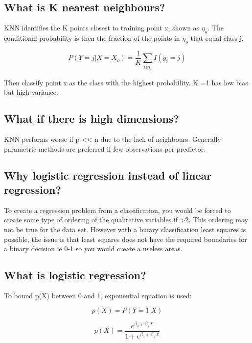 \documentclass[11pt]{scrartcl} %
\begin{document}
\subsection{What is K nearest neighbours?}

KNN identifies the K points closest to training point x, shown as \(\eta_o\). The conditional probability is then
the fraction of the points in \(\eta_o\) that equal class j.

\begin{equation}
	P(Y=j|X=X_o) = \frac{1}{K}\sum_{i\epsilon \eta_o}{I(y_i=j)}
\end{equation}

Then classify point x as the class with the highest probability. K =1 has low bias but high variance.

\subsection{What if there is high dimensions?}

KNN performs worse if p << n due to the lack of neighbours. Generally parametric methods are preferred if
few observations per predictor.

\subsection{Why logistic regression instead of linear regression?}

To create a regression problem from a classification, you would be forced to create some type of ordering of the qualitative
variables if >2. This ordering may not be true for the data set. However with a binary classification least squares is possible, the
issue is that least squares does not have the required boundaries for a binary decision ie 0-1 so you would create a useless areas.

\subsection{What is logistic regression?}

To bound p(X) between 0 and 1, exponential equation is used:

\begin{equation}
	p(X) = P(Y=1|X)
\end{equation}

\begin{equation}
	p(X) = \frac{e^{\beta_0 + \beta_1X}}{1+e^{\beta_0 + \beta_1X}}
\end{equation}
\end{document}
